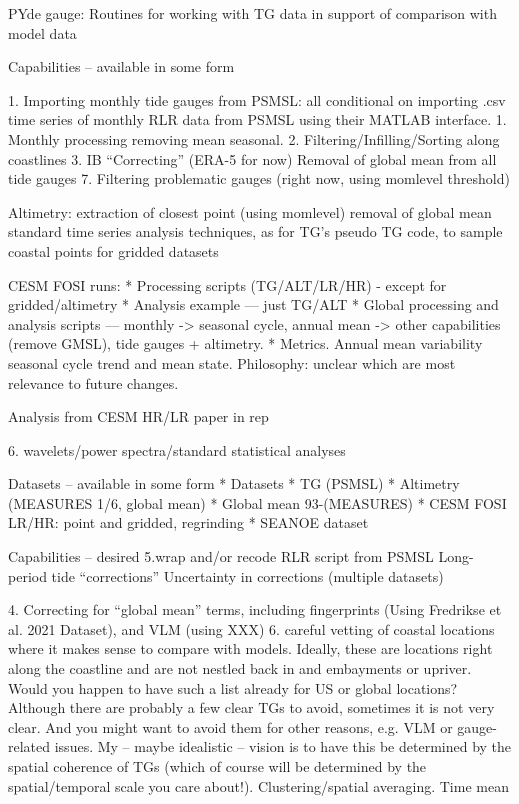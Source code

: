PYde gauge: Routines for working with TG data in support of comparison with model data

Capabilities -- available in some form

1. Importing monthly tide gauges from PSMSL: all conditional on importing .csv time series of monthly RLR data from PSMSL using their MATLAB interface. 
1. Monthly processing removing mean seasonal.
2. Filtering/Infilling/Sorting along coastlines
3. IB “Correcting” (ERA-5 for now)
Removal of global mean from all tide gauges
7. Filtering problematic gauges (right now, using momlevel threshold)

Altimetry:
extraction of closest point (using momlevel)
removal of global mean
standard time series analysis techniques, as for TG's
pseudo TG code, to sample coastal points for gridded datasets

CESM FOSI runs:
        * Processing scripts (TG/ALT/LR/HR)  - except for gridded/altimetry
        * Analysis example — just TG/ALT
    * Global processing and analysis scripts — monthly -> seasonal cycle, annual mean -> other capabilities (remove GMSL), tide gauges + altimetry. 
    * Metrics. Annual mean variability seasonal cycle trend and mean state. Philosophy: unclear which are most relevance to future changes.
    
    Analysis from CESM HR/LR paper in rep
    
    6. wavelets/power spectra/standard statistical analyses
    
Datasets -- available in some form
        * Datasets 
            * TG (PSMSL)
            * Altimetry (MEASURES 1/6, global mean)
            * Global mean 93-(MEASURES)
            * CESM FOSI LR/HR: point and gridded, regrinding
            * SEANOE dataset

Capabilities -- desired
5.wrap and/or recode RLR script from PSMSL
Long-period tide “corrections”
Uncertainty in corrections (multiple datasets)

4. Correcting for “global mean” terms, including fingerprints (Using Fredrikse et al. 2021 Dataset), and VLM (using XXX)
6. careful vetting of coastal locations where it makes sense to compare with models. Ideally, these are locations right along the coastline and are not nestled back in and embayments or upriver.  Would you happen to have such a list already for US or global locations? Although there are probably a few clear TGs to avoid, sometimes it is not very clear. And you might want to avoid them for other reasons, e.g. VLM or gauge-related issues. 
My -- maybe idealistic -- vision is to have this be determined by the spatial coherence of TGs (which of course will be determined by the spatial/temporal scale you care about!).
Clustering/spatial averaging.
Time mean

